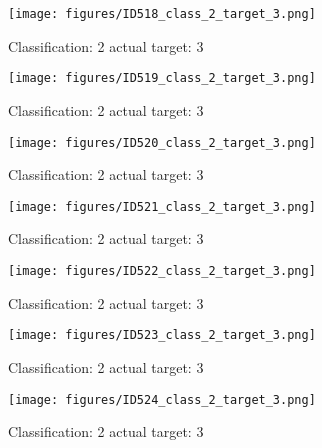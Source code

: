 \begin{figure}[h!]
\begin{center}
\texttt{[image: figures/ID518\_class\_2\_target\_3.png]}
\end{center}
\caption{ Classification: 2 actual target: 3}
\label{fig:ID518_class_2_target_3}
\end{figure}
\begin{figure}[h!]
\begin{center}
\texttt{[image: figures/ID519\_class\_2\_target\_3.png]}
\end{center}
\caption{ Classification: 2 actual target: 3}
\label{fig:ID519_class_2_target_3}
\end{figure}
\begin{figure}[h!]
\begin{center}
\texttt{[image: figures/ID520\_class\_2\_target\_3.png]}
\end{center}
\caption{ Classification: 2 actual target: 3}
\label{fig:ID520_class_2_target_3}
\end{figure}
\begin{figure}[h!]
\begin{center}
\texttt{[image: figures/ID521\_class\_2\_target\_3.png]}
\end{center}
\caption{ Classification: 2 actual target: 3}
\label{fig:ID521_class_2_target_3}
\end{figure}
\begin{figure}[h!]
\begin{center}
\texttt{[image: figures/ID522\_class\_2\_target\_3.png]}
\end{center}
\caption{ Classification: 2 actual target: 3}
\label{fig:ID522_class_2_target_3}
\end{figure}
\begin{figure}[h!]
\begin{center}
\texttt{[image: figures/ID523\_class\_2\_target\_3.png]}
\end{center}
\caption{ Classification: 2 actual target: 3}
\label{fig:ID523_class_2_target_3}
\end{figure}
\begin{figure}[h!]
\begin{center}
\texttt{[image: figures/ID524\_class\_2\_target\_3.png]}
\end{center}
\caption{ Classification: 2 actual target: 3}
\label{fig:ID524_class_2_target_3}
\end{figure}
